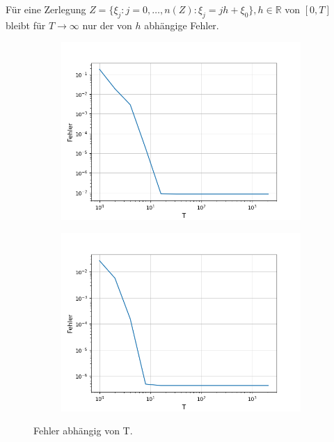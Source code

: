 \documentclass[12pt,a4paper]{scrartcl}
\numberwithin{equation}{section}
\numberwithin{myalgctr}{section}
\numberwithin{mytheoremctr}{subsection}
\numberwithin{mykorollarctr}{subsection}
\numberwithin{mylemmactr}{subsection}
\numberwithin{mybeispielctr}{subsection}
\begin{document}
	F\"ur eine Zerlegung $Z = \{\xi_j:j=0,\dots,n(Z):\xi_j = jh+\xi_0\} , h\in \mathbb{R}$ von $[0,T]$ bleibt f\"ur $T\to\infty$ nur der von $h$ abh\"angige Fehler.
	 	
	\begin{figure}[H]
		\begin{subfigure}[t]{0.5\textwidth}
			\includegraphics[width=\linewidth]{Fehlerplothsinx.png}
			 \label{fig:fehlerplothsinx}
		\end{subfigure}
		\begin{subfigure}[t]{0.5\textwidth}
			\includegraphics[width=\linewidth]{Fehlerplothexp.png}
			 \label{fig:fehlerplothexp}
		\end{subfigure}
		\caption{Fehler abhängig von T.}
		\label{fig:fehlerploth}
	\end{figure}
	
\end{document}
